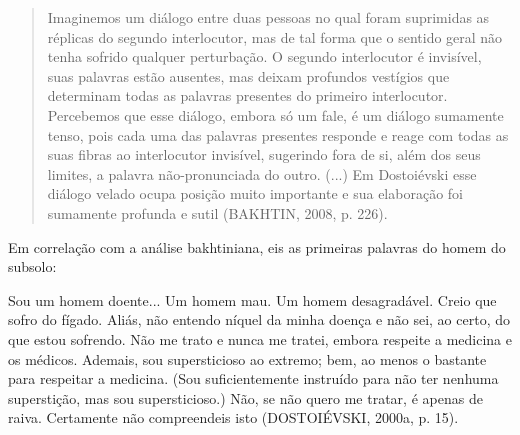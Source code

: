 \begin{quote}
Imaginemos um diálogo entre duas pessoas no qual foram suprimidas as
réplicas do segundo interlocutor, mas de tal forma que o sentido geral
não tenha sofrido qualquer perturbação. O segundo interlocutor é
invisível, suas palavras estão ausentes, mas deixam profundos vestígios
que determinam todas as palavras presentes do primeiro interlocutor.
Percebemos que esse diálogo, embora só um fale, é um diálogo sumamente
tenso, pois cada uma das palavras presentes responde e reage com todas
as suas fibras ao interlocutor invisível, sugerindo fora de si, além dos
seus limites, a palavra não-pronunciada do outro. (...) Em Dostoiévski
esse diálogo velado ocupa posição muito importante e sua elaboração foi
sumamente profunda e sutil (BAKHTIN, 2008, p. 226).
\end{quote}

Em correlação com a análise bakhtiniana, eis as primeiras palavras do
homem do subsolo:

Sou um homem doente... Um homem mau. Um homem desagradável. Creio que
sofro do fígado. Aliás, não entendo níquel da minha doença e não sei, ao
certo, do que estou sofrendo. Não me trato e nunca me tratei, embora
respeite a medicina e os médicos. Ademais, sou supersticioso ao extremo;
bem, ao menos o bastante para respeitar a medicina. (Sou suficientemente
instruído para não ter nenhuma superstição, mas sou supersticioso.) Não,
se não quero me tratar, é apenas de raiva. Certamente não compreendeis
isto (DOSTOIÉVSKI, 2000a, p. 15).

